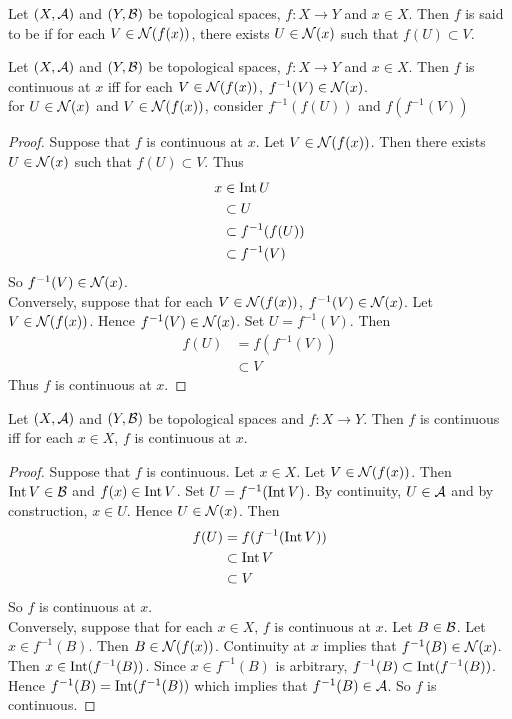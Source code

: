 \documentclass{book}
\begin{document}
	\begin{defn} \ld{}
	Let $(X,\mathcal{A})$ and $(Y,\mathcal{B})$ be topological spaces, $f:X \rightarrow Y$ and $x \in X$. Then $f$ is said to be  if for each $V \in \mathcal{N}(f(x))$, there exists $U \in \mathcal{N}(x)$ such that $f(U) \subset V$. 
	\end{defn}		
	
	\begin{ex} \lex{}
	Let $(X,\mathcal{A})$ and $(Y,\mathcal{B})$ be topological spaces, $f:X \rightarrow Y$ and $x \in X$. Then $f$ is continuous at $x$ iff for each $V \in \mathcal{N}(f(x))$, $f^{-1}(V) \in \mathcal{N}(x)$.\\
	 for $U \in \mathcal{N}(x)$ and $V \in \mathcal{N}(f(x))$, consider $f^{-1}(f(U))$ and $f(f^{-1}(V))$
	\end{ex}
	
	\begin{proof}
	Suppose that $f$ is continuous at $x$. Let $V \in \mathcal{N}(f(x))$. Then there exists $U \in \mathcal{N}(x)$ such that $f(U) \subset V$. Thus
	\begin{align*}
	x 
	&\in \operatorname{Int} U \\
	& \subset U \\
	&\subset f^{-1}(f(U)) \\
	&\subset f^{-1}(V)
	\end{align*}
	So $f^{-1}(V) \in \mathcal{N}(x)$.\\
	Conversely, suppose that for each $V \in \mathcal{N}(f(x))$, $f^{-1}(V) \in \mathcal{N}(x)$. Let $V \in \mathcal{N}(f(x))$. Hence $f^{-1}(V) \in \mathcal{N}(x)$. Set $U = f^{-1}(V)$. Then 
	\begin{align*}
	f(U) 
	&= f(f^{-1}(V)) \\
	& \subset V
	\end{align*}
	Thus $f$ is continuous at $x$.
	\end{proof}
	
	\begin{ex} \lex{}
	Let $(X,\mathcal{A})$ and $(Y,\mathcal{B})$ be topological spaces and $f:X \rightarrow Y$. Then $f$ is continuous iff for each $x \in X$, $f$ is continuous at $x$.
	\end{ex}
	
	\begin{proof}
	Suppose that $f$ is continuous. Let $x \in X$. Let $V \in \mathcal{N}(f(x))$. Then $\operatorname{Int} V \in \mathcal{B}$ and $f(x) \in \operatorname{Int} V$. Set $U = f^{-1}(\operatorname{Int} V)$. By continuity, $U \in \mathcal{A}$ and by construction, $x \in U$. Hence $U \in \mathcal{N}(x)$. Then 
	\begin{align*}
	f(U)
	&= f(f^{-1}(\operatorname{Int} V))\\
	& \subset \operatorname{Int} V\\
	& \subset V
\end{align*}	 	
So $f$ is continuous at $x$. \\
Conversely, suppose that for each $x \in X$, $f$ is continuous at $x$. Let $B \in \mathcal{B}$. Let $x \in f^{-1}(B)$. Then $B \in \mathcal{N}(f(x))$. Continuity at $x$ implies that $f^{-1}(B) \in \mathcal{N}(x)$. Then $x \in \operatorname{Int} (f^{-1}(B))$. Since $x \in f^{-1}(B)$ is arbitrary, $f^{-1}(B) \subset \operatorname{Int} (f^{-1}(B))$. Hence $f^{-1}(B) = \operatorname{Int} (f^{-1}(B))$ which implies that $f^{-1}(B) \in \mathcal{A}$. So $f$ is continuous.
	\end{proof}
	
\end{document}

